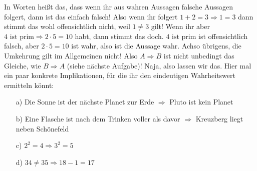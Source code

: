 \documentclass[12pt,a4paper,ngerman]{scrartcl}
\begin{document}
	In Worten heißt das, dass wenn ihr aus wahren Aussagen falsche Aussagen folgert, dann ist das einfach falsch! Also wenn ihr folgert $1+2=3 \Rightarrow 1=3$ dann stimmt das wohl offensichtlich nicht, weil $1 \ne 3$ gilt! Wenn ihr aber $4 \text{ ist prim} \Rightarrow 2 \cdot 5 = 10$ habt, dann stimmt das doch. $4 \text{ ist prim}$ ist offensichtlich falsch, aber $2 \cdot 5 = 10$ ist wahr, also ist die Aussage wahr. Achso übrigens, die Umkehrung gilt im Allgemeinen nicht! Also $A \Rightarrow B$ ist nicht unbedingt das Gleiche, wie $B \Rightarrow A$ (siehe nächste Aufgabe)!
	Naja, also lassen wir das. Hier mal ein paar konkrete Implikationen, für die ihr den eindeutigen Wahrheitswert ermitteln könnt:
	\begin{itemize}
		\item[a)] Die Sonne ist der nächste Planet zur Erde $\Rightarrow$ Pluto ist kein Planet
		\item[b)] Eine Flasche ist nach dem Trinken voller als davor $\Rightarrow$ Kreuzberg liegt neben Schönefeld
		\item[c)] $2^2 = 4 \Rightarrow 3^2 = 5$
		\item[d)] $34 \ne 35 \Rightarrow 18-1=17$
	\end{itemize}
	
\end{document}
